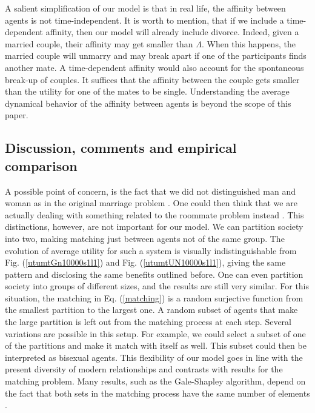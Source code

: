 \documentclass[12pt]{article}
\begin{document}
A salient simplification of our model is that in real life, the affinity between agents is not time-independent. It is worth to mention, that if we include a time-dependent affinity, then our model will already include divorce. Indeed, given a married couple, their affinity may get smaller than $\Lambda$. When this happens, the married couple will unmarry and may break apart if one of the participants finds another mate. A time-dependent affinity would also account for the spontaneous break-up of couples. It suffices that the affinity between the couple gets smaller than the utility for one of the mates to be single. Understanding the average dynamical behavior of the affinity between agents is beyond the scope of this paper. %


\subsection{Discussion, comments and empirical comparison}
\label{discussionandcomments}

A possible point of concern, is the fact that we did not distinguished man and woman as in the original marriage problem \cite{10.2307/2312726}. One could then think that we are actually dealing with something related to the roommate problem instead \cite{10.2307/2312726}. This distinctions, however, are not important for our model. We can partition society into two, making matching just between agents not of the same group. The evolution of average utility for such a system is visually indistinguishable from Fig. (\ref{utumtGn10000s1l1}) and Fig. (\ref{utumtUN10000s1l1}), giving the same pattern and disclosing the same benefits outlined before. One can even partition society into groups of different sizes, and the results are still very similar. For this situation, the matching in Eq. (\ref{matching}) is a random surjective function from the smallest partition to the largest one. A random subset of agents that make the large partition is left out from the matching process at each step. Several variations are possible in this setup. For example, we could select a subset of one of the partitions and make it match with itself as well. This subset could then be interpreted as bisexual agents. This flexibility of our model goes in line with the present diversity of modern relationships and contrasts with results for the matching problem. Many results, such as the Gale-Shapley algorithm, depend on the fact that both sets in the matching process have the same number of elements \cite{roth1992two}.
\end{document}
